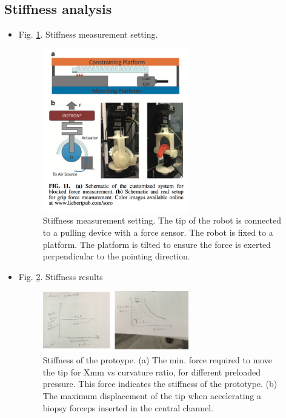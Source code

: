 \documentclass[journal,onecolumn]{IEEEtran}
\begin{document}
\subsection{Stiffness analysis}
\label{sec:orgf8f8743}
\begin{itemize}
\item Fig. \ref{fig:orgfa879b2}. Stiffness measurement setting.

\begin{figure}[!h]
\centering
\includegraphics[width=0.6\textwidth]{./fig/fig-stiffness_test_setting.png}
\caption{\label{fig:orgfa879b2}
Stiffness measurement setting. The tip of the robot is connected to a pulling device with a force sensor. The robot is fixed to a platform. The platform is tilted to ensure the force is exerted perpendicular to the pointing direction.}
\end{figure}

\item Fig. \ref{fig:orgd6e64ad}. Stiffness results

\begin{figure}[!h]
\centering
\includegraphics[width=0.6\textwidth]{./fig/fig-stiffness_results.png}
\caption{\label{fig:orgd6e64ad}
Stiffness of the protoype. (a) The min. force required to move the tip for Xmm vs curvature ratio, for different preloaded pressure. This force indicates the stiffness of the prototype. (b) The maximum displacement of the tip when accelerating a biopsy forceps inserted in the central channel.}
\end{figure}


\end{itemize}
\end{document}
